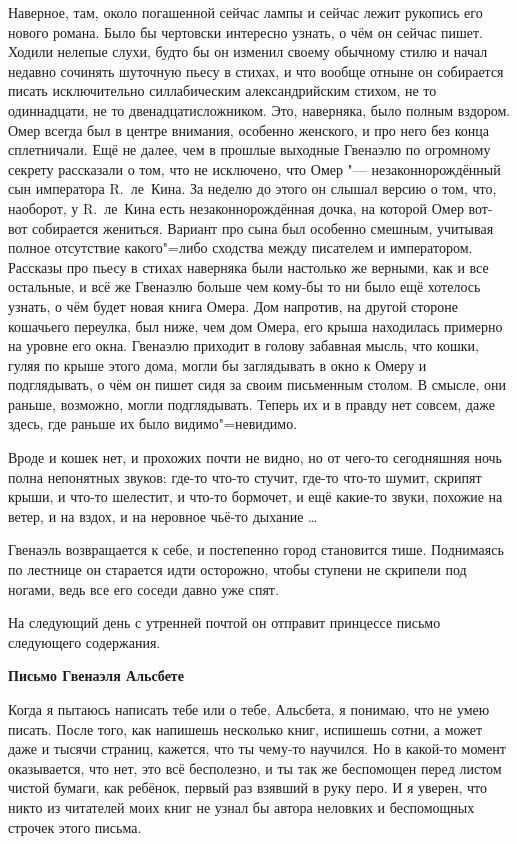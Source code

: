Наверное, там, около погашенной сейчас лампы и сейчас лежит рукопись его нового
романа.
Было бы чертовски интересно узнать, о чём он сейчас пишет.
Ходили нелепые слухи, будто бы он изменил своему обычному стилю и начал недавно
сочинять шуточную пьесу в стихах, и что вообще отныне он собирается писать
исключительно силлабическим александрийским стихом, не то одиннадцати, не то
двенадцатисложником.
Это, наверняка, было полным вздором.
Омер всегда был в центре внимания, особенно женского, и про него без конца
сплетничали.
Ещё не далее, чем в прошлые выходные Гвенаэлю по огромному секрету рассказали о
том, что не исключено, что Омер "--- незаконнорождённый сын императора
R.~ле~Кина.
За неделю до этого он слышал версию о том, что, наоборот, у R.~ле~Кина есть
незаконнорождённая дочка, на которой Омер вот-вот собирается жениться.
Вариант про сына был особенно смешным, учитывая полное отсутствие какого"=либо
сходства между писателем и императором.
Рассказы про пьесу в стихах наверняка были настолько же верными, как и все
остальные, и всё же Гвенаэлю больше чем кому-бы то ни было ещё хотелось узнать,
о чём будет новая книга Омера.
Дом напротив, на другой стороне кошачьего переулка, был ниже, чем дом Омера,
его крыша находилась примерно на уровне его окна.
Гвенаэлю приходит в голову забавная мысль, что кошки, гуляя по крыше этого дома,
могли бы заглядывать в окно к Омеру и подглядывать, о чём он пишет сидя за своим
письменным столом.
В смысле, они раньше, возможно, могли подглядывать.
Теперь их и в правду нет совсем, даже здесь, где раньше их было видимо"=невидимо.

Вроде и кошек нет, и прохожих почти не видно, но от чего-то сегодняшняя ночь
полна непонятных звуков: где-то что-то стучит, где-то что-то шумит, скрипят
крыши, и что-то шелестит, и что-то бормочет, и ещё какие-то звуки, похожие на
ветер, и на вздох, и на неровное чьё-то дыхание \ldots

Гвенаэль возвращается к себе, и постепенно город становится тише.
Поднимаясь по лестнице он старается идти осторожно, чтобы ступени не скрипели
под ногами, ведь все его соседи давно уже спят.

На следующий день с утренней почтой он отправит принцессе письмо следующего
содержания.

\medskip
\begin{center}
\textbf{Письмо Гвенаэля Альсбете}
\end{center}

\medskip
Когда я пытаюсь написать тебе или о тебе, Альсбета, я понимаю, что не умею
писать.
После того, как напишешь несколько книг, испишешь сотни, а может даже и тысячи
страниц, кажется, что ты чему-то научился.
Но в какой-то момент оказывается, что нет, это всё бесполезно, и ты так же
беспомощен перед листом чистой бумаги, как ребёнок, первый раз взявший в руку
перо.
И я уверен, что никто из читателей моих книг не узнал бы автора неловких и
беспомощных строчек этого письма.

